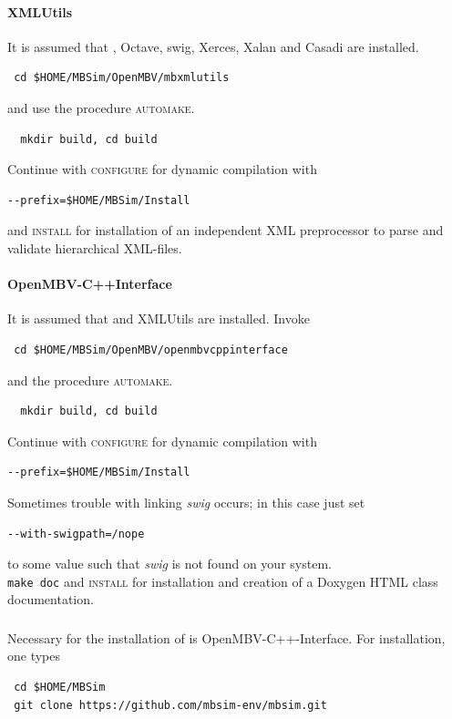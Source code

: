 \paragraph{XMLUtils}
It is assumed that \FMatVec{}, Octave, swig, Xerces, Xalan and Casadi are installed.
\begin{verbatim}
 cd $HOME/MBSim/OpenMBV/mbxmlutils
\end{verbatim} 
and use the procedure \textsc{automake}.
\begin{verbatim}
  mkdir build, cd build
\end{verbatim}
Continue with \textsc{configure} for dynamic compilation with
\begin{verbatim}
--prefix=$HOME/MBSim/Install
\end{verbatim}
and \textsc{install} for installation of an independent XML preprocessor to parse and validate hierarchical XML-files.

\paragraph{OpenMBV-C++Interface}
It is assumed that \HDFSerie{} and XMLUtils are installed. Invoke
\begin{verbatim}
 cd $HOME/MBSim/OpenMBV/openmbvcppinterface
\end{verbatim} 
and the procedure \textsc{automake}.
\begin{verbatim}
  mkdir build, cd build
\end{verbatim}
Continue with \textsc{configure} for dynamic compilation with
\begin{verbatim}
--prefix=$HOME/MBSim/Install
\end{verbatim}
Sometimes trouble with linking \emph{swig} occurs; in this case just set
\begin{verbatim}
--with-swigpath=/nope
\end{verbatim}
to some value such that \emph{swig} is not found on your system.\\
%
\texttt{make doc} and \textsc{install} for installation and creation of a Doxygen HTML class documentation. 
%
\subsubsection{\MBSim}
Necessary for the installation of \MBSim{} is OpenMBV-C++-Interface. For installation, one types
\begin{verbatim}
 cd $HOME/MBSim
 git clone https://github.com/mbsim-env/mbsim.git
\end{verbatim}
%
